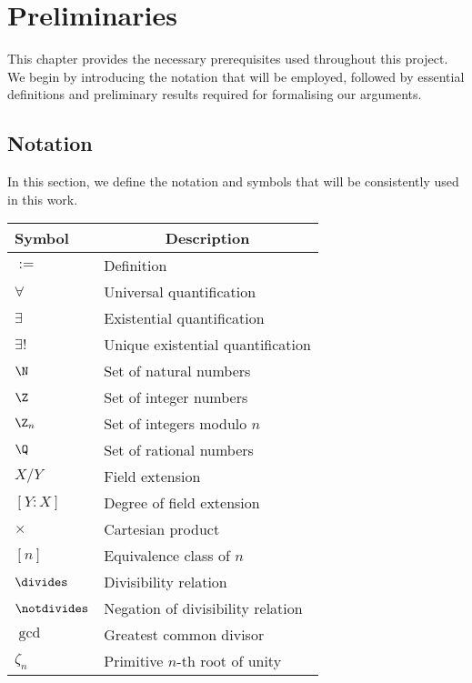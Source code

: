 \chapter{Preliminaries}

This chapter provides the necessary prerequisites used throughout this project.
We begin by introducing the notation that will be employed, followed by essential definitions and
preliminary results required for formalising our arguments.

\section{Notation}

In this section, we define the notation and symbols that will be consistently used in this work.

\begin{tabular}{>{\centering}m{1.8cm} m{5.8cm}}
\toprule
\textbf{Symbol} & \multicolumn{1}{c}{\textbf{Description}} \\
\midrule
$:=$   & Definition \\
$\forall$ & Universal quantification \\
$\exists$ & Existential quantification \\
$\exists!$ & Unique existential quantification \\
$\N$ & Set of natural numbers \\
$\Z$ & Set of integer numbers \\
$\Z_n$ & Set of integers modulo $n$ \\
$\Q$ & Set of rational numbers \\
$X/Y$ & Field extension \\
$[Y:X]$ & Degree of field extension \\
$\times$ & Cartesian product \\
$[n]$ & Equivalence class of $n$ \\
$\divides$ & Divisibility relation \\
$\notdivides$ & Negation of divisibility relation \\
$\gcd$ & Greatest common divisor \\
$\zeta_n$ & Primitive $n$-th root of unity \\
\bottomrule
\end{tabular}

